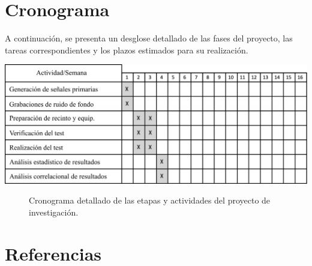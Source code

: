 \documentclass[a4paper,12pt]{article}
\begin{document}
\section{Cronograma}

A continuación, se presenta un desglose detallado de las fases del proyecto, las tareas correspondientes y los plazos estimados para su realización.

\begin{center}
    \includegraphics[width=\linewidth]{images/schedule.png}
\end{center}
\vspace{\captionSpace}
\begin{figure}[H]
    \caption{Cronograma detallado de las etapas y actividades del proyecto de investigación.}
    \label{fig:schedule}
\end{figure}

\section{Referencias}
\renewcommand{\refname}{}
\vspace{-3em}
\printbibliography
\end{document}
